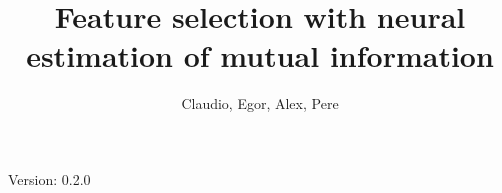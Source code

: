 \documentclass{mypaper}
\author{
Claudio,
Egor,
Alex,
Pere
}
\title{Feature selection with neural estimation of mutual information}
\begin{document}
\maketitle

Version: 0.2.0







\end{document}
